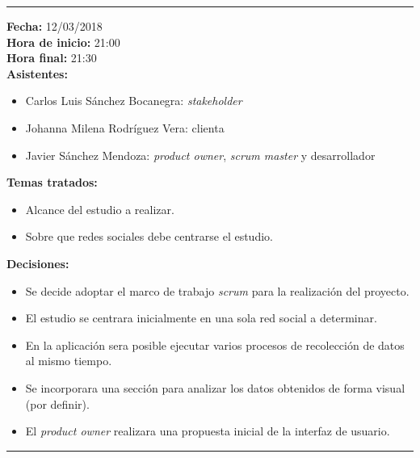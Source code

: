 \documentclass[11pt,a4paper]{article}
\begin{document}
\begin{center}\rule{10cm}{0.4pt}\end{center}

\noindent\textbf{Fecha:} 12/03/2018
\\
\noindent\textbf{Hora de inicio:} 21:00
\\
\noindent\textbf{Hora final:} 21:30
\\
\noindent\textbf{Asistentes:} 
\begin{itemize}
\item Carlos Luis Sánchez Bocanegra: \textit{stakeholder}
\item Johanna Milena Rodríguez Vera: clienta
\item Javier Sánchez Mendoza: \textit{product owner}, \textit{scrum master} y desarrollador
\end{itemize}
\noindent\textbf{Temas tratados:}
\begin{itemize}
\item Alcance del estudio a realizar.
\item Sobre que redes sociales debe centrarse el estudio.
\end{itemize}
\noindent\textbf{Decisiones:}
\begin{itemize}
\item Se decide adoptar el marco de trabajo \textit{scrum} para la realización del proyecto.
\item El estudio se centrara inicialmente en una sola red social a determinar.
\item En la aplicación sera posible ejecutar varios procesos de recolección de datos al mismo tiempo.
\item Se incorporara una sección para analizar los datos obtenidos de forma visual (por definir).
\item El \textit{product owner} realizara una propuesta inicial de la interfaz de usuario.
\end{itemize}

\begin{center}\rule{10cm}{0.4pt}\end{center}
\end{document}
